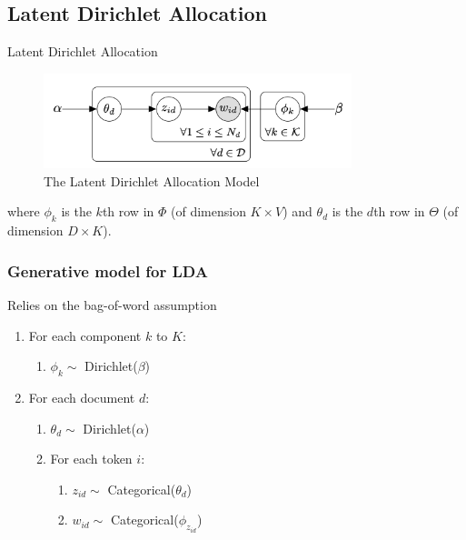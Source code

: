 \documentclass[10pt]{beamer}
\begin{document}
\subsection{Latent Dirichlet Allocation}

\begin{frame}{Latent Dirichlet Allocation}

\begin{figure}[h]
\centering
\includegraphics[width=0.8\textwidth]{fig/lda_model.png}
\caption{The Latent Dirichlet Allocation Model}
\end{figure}
where $\phi_k$ is the $k$th row in $\Phi$ (of dimension $K \times V$) and $\theta_d$ is the $d$th row in $\Theta$ (of dimension $D \times K$).

\end{frame}

\begin{frame}
\frametitle{Generative model for LDA}


Relies on the {\color{uured} bag-of-word} assumption


\begin{enumerate}
    \item For each component $k$ to $K$:
    \begin{enumerate}
        \item $\phi_k \sim$ Dirichlet($\beta$)
    \end{enumerate}
    \item For each document $d$:
    \begin{enumerate}
        \item $\theta_d \sim$ Dirichlet($\alpha$)
        \item For each token $i$:
        \begin{enumerate}
            \item $z_{id} \sim$  Categorical($\theta_d$)
            \item $w_{id} \sim$  Categorical($\phi_{z_{id}}$)
        \end{enumerate}
    \end{enumerate}
\end{enumerate}

\end{frame}
\end{document}
